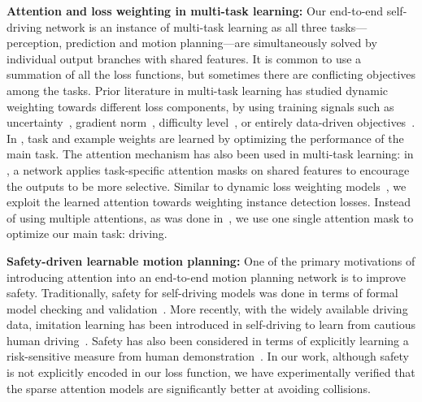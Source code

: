 \textbf{Attention and loss weighting in multi-task learning:}
Our end-to-end self-driving network is an instance of multi-task learning as all three
tasks---perception, prediction and motion planning---are simultaneously solved by individual output
branches with shared features. It is common to use a summation of all the loss functions, but
sometimes there are conflicting objectives among the tasks. Prior literature in multi-task learning
has studied dynamic weighting towards different loss components, by using training signals such as
uncertainty~\cite{mtluncertain}, gradient norm~\cite{gradnorm}, difficulty
level~\cite{dynamicprioritize}, or entirely data-driven objectives~\cite{adaptiveweight,l2rw}. In
\cite{adaptiveweight,l2rw}, task and example weights are learned by optimizing the performance of the
main task. The attention mechanism has also been used in multi-task learning: in \cite{e2emtl}, a
network applies task-specific attention masks on shared features to encourage the outputs to be more
selective. Similar to dynamic loss weighting models~\cite{adaptiveweight}, we exploit the learned
attention towards weighting instance detection losses. Instead of using multiple attentions, as was
done in~\cite{e2emtl}, we use one single attention mask to optimize our main task: driving.

\textbf{Safety-driven learnable motion planning:}
One of the primary motivations of introducing attention into an end-to-end motion planning network is
to improve safety. Traditionally, safety for self-driving models was done in terms of
formal model checking and validation~\cite{formalsafety,combinatorialsafe,setsafety,failsafe,pnpsim}. More
recently, with the widely available driving data, imitation learning has been introduced in
self-driving to learn from cautious human driving~\cite{nmp,baidu,jointplt,pthree,dsdnet}. Safety has also been
considered in terms of explicitly learning a risk-sensitive measure from human
demonstration~\cite{riskirl,riskgail}. In our work, although safety is not explicitly encoded in our
loss function, we have experimentally verified that the sparse attention models are significantly
better at avoiding collisions.